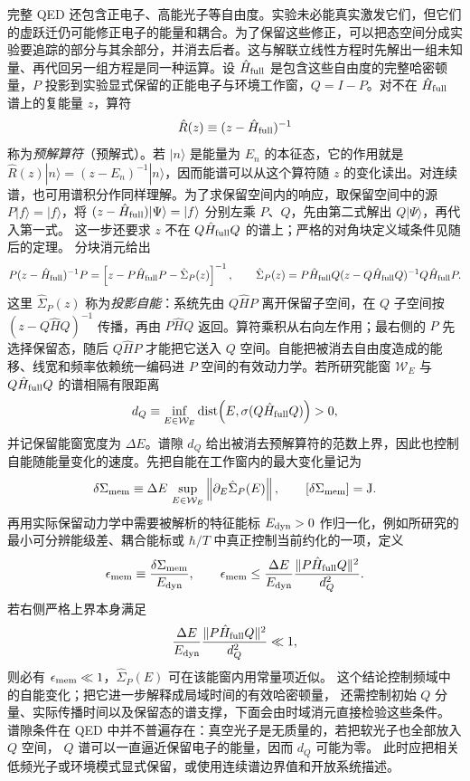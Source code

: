 完整 QED 还包含正电子、高能光子等自由度。实验未必能真实激发它们，但它们的虚跃迁仍可能修正电子的能量和耦合。为了保留这些修正，可以把态空间分成实验要追踪的部分与其余部分，并消去后者。这与解联立线性方程时先解出一组未知量、再代回另一组方程是同一种运算。设 $\hat H_{\rm full}$ 是包含这些自由度的完整哈密顿量，$P$ 投影到实验显式保留的正能电子与环境工作窗，$Q=I-P$。对不在 $\hat H_{\rm full}$ 谱上的复能量 $z$，算符
\[
\hat R(z)\equiv(z-\hat H_{\rm full})^{-1}
\]
称为\emph{预解算符}（预解式）。若 $|n\rangle$ 是能量为 $E_n$ 的本征态，它的作用就是 $\hat R(z)|n\rangle=(z-E_n)^{-1}|n\rangle$，因而能谱可以从这个算符随 $z$ 的变化读出。对连续谱，也可用谱积分作同样理解。为了求保留空间内的响应，取保留空间中的源 $P|f\rangle=|f\rangle$，将 $(z-\hat H_{\rm full})|\Psi\rangle=|f\rangle$ 分别左乘 $P$、$Q$，先由第二式解出 $Q|\Psi\rangle$，再代入第一式。
这一步还要求 $z$ 不在 $Q\hat H_{\rm full}Q$ 的谱上；严格的对角块定义域条件见随后的定理。
分块消元给出
\begin{equation}
{
P(z-\hat H_{\rm full})^{-1}P
=
\left[
z-P\hat H_{\rm full}P-\hat\Sigma_P(z)
\right]^{-1},
\qquad
\hat\Sigma_P(z)
=P\hat H_{\rm full}Q
(z-Q\hat H_{\rm full}Q)^{-1}
Q\hat H_{\rm full}P .}
\label{eq:free_electron_feshbach_resolvent_mother}
\end{equation}
这里 $\hat\Sigma_P(z)$ 称为\emph{投影自能}：系统先由 $Q\hat H P$ 离开保留子空间，在 $Q$ 子空间按 $(z-Q\hat H Q)^{-1}$ 传播，再由 $P\hat H Q$ 返回。算符乘积从右向左作用；最右侧的 $P$ 先选择保留态，随后 $Q\hat H P$ 才能把它送入 $Q$ 空间。自能把被消去自由度造成的能移、线宽和频率依赖统一编码进 $P$ 空间的有效动力学。若所研究能窗 $\mathcal W_E$ 与 $Q\hat H_{\rm full}Q$ 的谱相隔有限距离
\[
d_Q
\equiv
\inf_{E\in\mathcal W_E}
\operatorname{dist}
\!\left(E,\sigma(Q\hat H_{\rm full}Q)\right)>0,
\]
并记保留能窗宽度为 $\Delta E$。谱隙 $d_Q$ 给出被消去预解算符的范数上界，因此也控制自能随能量变化的速度。先把自能在工作窗内的最大变化量记为
\begin{equation*}
\delta\Sigma_{\rm mem}
\equiv
\Delta E\,
\sup_{E\in\mathcal W_E}
\left\|
\partial_E\hat\Sigma_P(E)
\right\|,
\qquad
[\delta\Sigma_{\rm mem}]={\rm J}.
\end{equation*}
再用实际保留动力学中需要被解析的特征能标 $E_{\rm dyn}>0$ 作归一化，例如所研究的最小可分辨能级差、耦合能标或 $\hbar/T$ 中真正控制当前约化的一项，定义
\begin{equation}
{
\epsilon_{\rm mem}
\equiv
\frac{\delta\Sigma_{\rm mem}}{E_{\rm dyn}},
\qquad
\epsilon_{\rm mem}
\le
\frac{\Delta E}{E_{\rm dyn}}
\frac{\|P\hat H_{\rm full}Q\|^2}{d_Q^2}.}
\label{eq:free_electron_effective_memory_control}
\end{equation}
若右侧严格上界本身满足
\begin{equation*}
\frac{\Delta E}{E_{\rm dyn}}
\frac{\|P\hat H_{\rm full}Q\|^2}{d_Q^2}\ll1,
\end{equation*}
则必有 $\epsilon_{\rm mem}\ll1$，$\hat\Sigma_P(E)$ 可在该能窗内用常量项近似。
这个结论控制频域中的自能变化；把它进一步解释成局域时间的有效哈密顿量，
还需控制初始 $Q$ 分量、实际传播时间以及保留态的谱支撑，下面会由时域消元直接检验这些条件。
谱隙条件在 QED 中并不普遍存在：真空光子是无质量的，若把软光子也全部放入 $Q$ 空间，
$Q$ 谱可以一直逼近保留电子的能量，因而 $d_Q$ 可能为零。
此时应把相关低频光子或环境模式显式保留，或使用连续谱边界值和开放系统描述。

